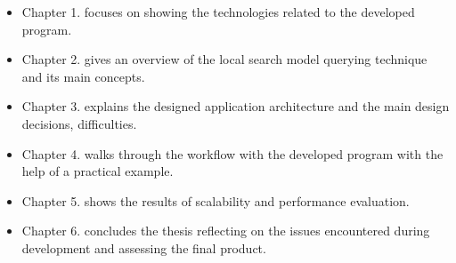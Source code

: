 \begin{itemize}
  \item Chapter 1. focuses on showing the technologies related to the developed program.
  \item Chapter 2. gives an overview of the local search model querying technique
  and its main concepts.
  \item Chapter 3. explains the designed application architecture and the main
  design decisions, difficulties.
  \item Chapter 4. walks through the workflow with the developed program with the help of a practical example.
  \item Chapter 5. shows the results of scalability and performance evaluation.
  \item Chapter 6. concludes the thesis reflecting on the issues encountered
  during development and assessing the final product.
\end{itemize}